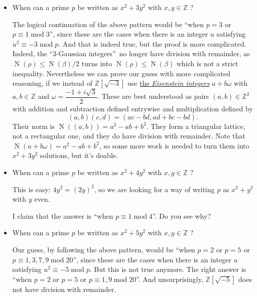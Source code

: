 \documentclass[numbers=enddot,12pt,final,onecolumn,notitlepage]{scrartcl}%
\numberwithin{exer}{subsection}
\theoremstyle{definition}
\begin{document}
\begin{itemize}
\item When can a prime $p$ be written as $x^{2}+3y^{2}$ with $x,y\in
\mathbb{Z}$ ?

The logical continuation of the above pattern would be \textquotedblleft when
$p=3$ or $p\equiv1\operatorname{mod}3$\textquotedblright, since these are the
cases when there is an integer $u$ satisfying $u^{2}\equiv-3\operatorname{mod}%
p$. And that is indeed true, but the proof is more complicated. Indeed, the
\textquotedblleft$3$-Gaussian integers\textquotedblright\ no longer have
division with remainder, as $\operatorname*{N}\left(  \rho\right)
\leq\operatorname*{N}\left(  \beta\right)  /2$ turns into $\operatorname*{N}%
\left(  \rho\right)  \leq\operatorname*{N}\left(  \beta\right)  $ which is not
a strict inequality. Nevertheless we can prove our guess with more complicated
reasoning, if we instead of $\mathbb{Z}\left[  \sqrt{-3}\right]  $ use
\href{https://en.wikipedia.org/wiki/Eisenstein_integer}{the \textit{Eisenstein
integers}} $a+b\omega$ with $a,b\in\mathbb{Z}$ and $\omega=\dfrac{-1+i\sqrt
{3}}{2}$. These are best understood as pairs $\left(  a,b\right)
\in\mathbb{Z}^{2}$ with addition and subtraction defined entrywise and
multiplication defined by%
\[
\left(  a,b\right)  \left(  c,d\right)  =\left(  ac-bd,ad+bc-bd\right)  .
\]
Their norm is $\operatorname*{N}\left(  \left(  a,b\right)  \right)
=a^{2}-ab+b^{2}$. They form a triangular lattice, not a rectangular one, and
they do have division with remainder. Note that $\operatorname*{N}\left(
a+b\omega\right)  =a^{2}-ab+b^{2}$, so some more work is needed to turn them
into $x^{2}+3y^{2}$ solutions, but it's doable.

\item When can a prime $p$ be written as $x^{2}+4y^{2}$ with $x,y\in
\mathbb{Z}$ ?

This is easy: $4y^{2}=\left(  2y\right)  ^{2}$, so we are looking for a way of
writing $p$ as $x^{2}+y^{2}$ with $y$ even.

I claim that the answer is \textquotedblleft when $p\equiv1\operatorname{mod}%
4$\textquotedblright. Do you see why?

\item When can a prime $p$ be written as $x^{2}+5y^{2}$ with $x,y\in
\mathbb{Z}$ ?

Our guess, by following the above pattern, would be \textquotedblleft when
$p=2$ or $p=5$ or $p\equiv1,3,7,9\operatorname{mod}20$\textquotedblright,
since these are the cases when there is an integer $u$ satisfying $u^{2}%
\equiv-5\operatorname{mod}p$. But this is not true anymore. The right answer
is \textquotedblleft when $p=2$ or $p=5$ or $p\equiv1,9\operatorname{mod}%
20$\textquotedblright. And unsurprisingly, $\mathbb{Z}\left[  \sqrt
{-5}\right]  $ does not have division with remainder.


\end{itemize}
\end{document}
